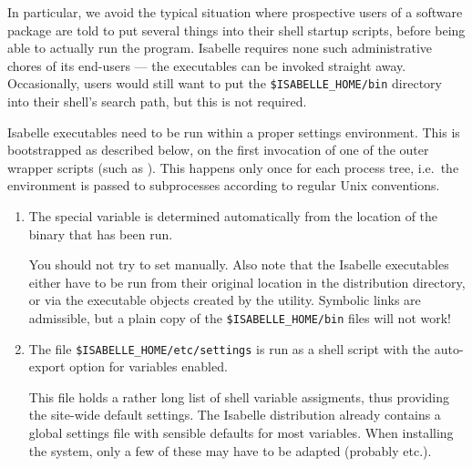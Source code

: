\begin{isabellebody}
\begin{isamarkuptext}
  In particular, we avoid the typical situation where prospective
  users of a software package are told to put several things into
  their shell startup scripts, before being able to actually run the
  program. Isabelle requires none such administrative chores of its
  end-users --- the executables can be invoked straight away.
  Occasionally, users would still want to put the \verb|$ISABELLE_HOME/bin| directory into their shell's search path, but
  this is not required.%
\end{isamarkuptext}%
\isamarkuptrue%
%
\isamarkuptrue%
%
\begin{isamarkuptext}%
Isabelle executables need to be run within a proper settings
  environment.  This is bootstrapped as described below, on the first
  invocation of one of the outer wrapper scripts (such as
  \hyperlink{executable.isabelle}{\mbox{}}).  This happens only once for each
  process tree, i.e.\ the environment is passed to subprocesses
  according to regular Unix conventions.

  \begin{enumerate}

  \item The special variable \hypertarget{setting.ISABELLE-HOME}{\hyperlink{setting.ISABELLE-HOME}{\mbox{}}} is
  determined automatically from the location of the binary that has
  been run.
  
  You should not try to set \hyperlink{setting.ISABELLE-HOME}{\mbox{}} manually. Also
  note that the Isabelle executables either have to be run from their
  original location in the distribution directory, or via the
  executable objects created by the \hyperlink{tool.install}{\mbox{}} utility.  Symbolic
  links are admissible, but a plain copy of the \verb|$ISABELLE_HOME/bin| files will not work!

  \item The file \verb|$ISABELLE_HOME/etc/settings| is run as a
  \hyperlink{executable.bash}{\mbox{}} shell script with the auto-export option for
  variables enabled.
  
  This file holds a rather long list of shell variable assigments,
  thus providing the site-wide default settings.  The Isabelle
  distribution already contains a global settings file with sensible
  defaults for most variables.  When installing the system, only a few
  of these may have to be adapted (probably \hyperlink{setting.ML-SYSTEM}{\mbox{}}
  etc.).
  

\end{enumerate}
\end{isamarkuptext}
\end{isabellebody}
